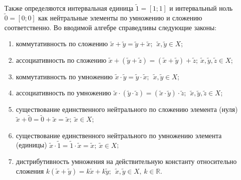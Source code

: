 Также определяются интервальная единица $\tilde{1}=\left[ 1;1 \right]$ и интервальный ноль $\tilde{0}=\left[ 0;0 \right]$ как нейтральные элементы по умножению и сложению соответственно. Во вводимой алгебре справедливы следующие законы:
\begin{enumerate}
	\item коммутативность по сложению $\tilde{x}+\tilde{y}=\tilde{y}+\tilde{x};\ \ \tilde{x},\tilde{y}\in X$;
	\item ассоциативность по сложению $\tilde{x}+\left( \tilde{y}+\tilde{z} \right)=\left( \tilde{x}+\tilde{y} \right)+\tilde{z};\ \tilde{x},\tilde{y},\tilde{z}\in X$;
	\item коммутативность по умножению $\tilde{x}\cdot \tilde{y}=\tilde{y}\cdot \tilde{x};\ \ \tilde{x},\tilde{y}\in X$;
	\item ассоциативность по умножению $\tilde{x}\cdot \left( \tilde{y}\cdot \tilde{z} \right)=\left( \tilde{x}\cdot \tilde{y} \right)\cdot \tilde{z};\ \ \tilde{x},\tilde{y},\tilde{z}\in X$;
	\item существование единственного нейтрального по сложению элемента (нуля) $\tilde{x}+\tilde{0}=\tilde{0}+\tilde{x}=\tilde{x};\ \tilde{x}\in X$;
	\item существование единственного нейтрального по умножению элемента (единицы) $\tilde{x}\cdot \tilde{1}=\tilde{1}\cdot \tilde{x}=\tilde{x};\ \tilde{x}\in X$;
	\item дистрибутивность умножения на действительную константу относительно сложения $k\left( \tilde{x}+\tilde{y} \right)=k\tilde{x}+k\tilde{y};\ \ \tilde{x},\tilde{y}\in X,\ k\in \mathbb{R}$.
\end{enumerate}

